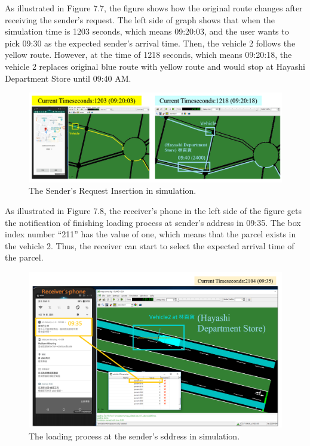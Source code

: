 \documentclass[12pt]{ksthesis}
\begin{document}
\begin{thesis}
{As illustrated in Figure 7.7, the figure shows how the original route changes after receiving the sender’s request.
The left side of graph shows that when the simulation time is 1203 seconds, which means 09:20:03, and the user wants to pick 09:30 as the expected sender’s arrival time. Then, the vehicle 2 follows the yellow route. However, at the time of 1218 seconds, which means 09:20:18, the vehicle 2 replaces original blue route with yellow route and would stop at Hayashi Department Store until 09:40 AM.

\begin{figure}[H]
\centering
\includegraphics[width=1.12\textwidth]{./Thesis_figures/F7-7_senderRequest.PNG}
\caption{\large The Sender’s Request Insertion in simulation.}
\vspace{0.5cm}
\label{Fig:sender_request}
\end{figure}


As illustrated in Figure 7.8, the receiver’s phone in the left side of the figure gets the notification of finishing loading process at sender’s address in 09:35. The box index number “211” has the value of one, which means that the parcel exists in the vehicle 2. Thus, the receiver can start to select the expected arrival time of the parcel.

\begin{figure}[H]
\centering
\includegraphics[width=1.12\textwidth]{./Thesis_figures/F7-8_loadingProcess.PNG}
\caption{\large The loading process at the sender’s sddress in simulation.}
\vspace{0.5cm}
\label{Fig:LoadingProcess}
\end{figure}


}
\end{thesis}
\end{document}
